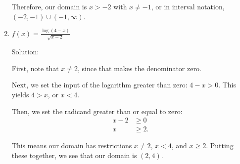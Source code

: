 \documentclass{ximera}
\begin{document}
\begin{enumerate}
\begin{expandable}
Therefore, our domain is $x > -2$ with $x \ne -1$, or in interval notation, $(-2, -1) \cup (-1, \infty)$. 
		\end{expandable}
	\item $f(x) = \frac{\log(4 - x)}{\sqrt{x - 2}}$
		\begin{expandable}
			Solution:

First, note that $x \ne 2$, since that makes the denominator zero.

Next, we set the input of the logarithm greater than zero: $4 - x > 0$. This yields $4 > x$, or $x < 4$.

Then, we set the radicand greater than or equal to zero: \begin{align*}x - 2&\ge 0 \\ x & \ge 2. \end{align*}

This means our domain has restrictions $x \ne 2$, $x < 4$, and $x \ge 2$. Putting these together, we see that our domain is $(2, 4)$. 
		\end{expandable}
\end{enumerate}



\end{document}
